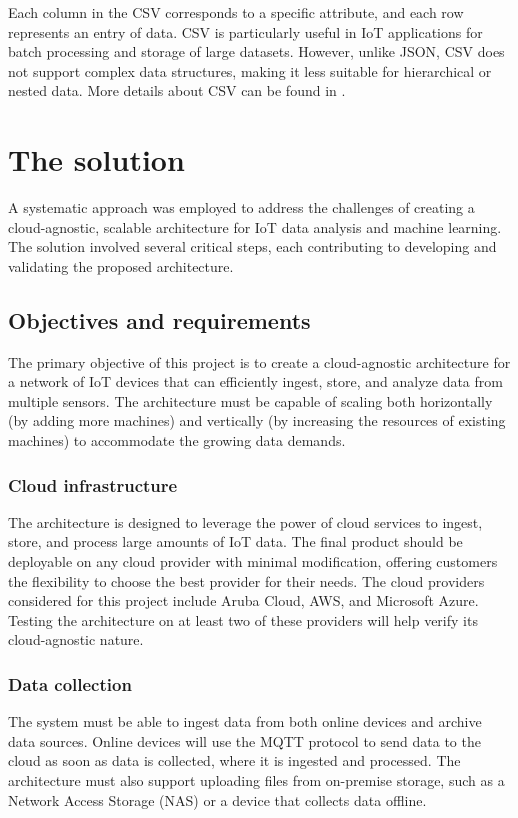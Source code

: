 Each column in the CSV corresponds to a specific attribute, and each row represents an entry of data. CSV is particularly useful in IoT applications for batch processing and storage of large datasets. However, unlike JSON, CSV does not support complex data structures, making it less suitable for hierarchical or nested data. More details about CSV can be found in \cite{site:csv-docs}.


\section{The solution}
\label{sec:the-solution}
A systematic approach was employed to address the challenges of creating a cloud-agnostic, scalable architecture for IoT data analysis
and machine learning. The solution involved several
critical steps, each contributing to developing and validating the proposed architecture.


\subsection{Objectives and requirements}
\label{sec:objectives-and-requirements}
The primary objective of this project is to create a cloud-agnostic architecture for a network of IoT devices that can efficiently ingest, store, and analyze data from multiple sensors. The architecture must be capable of scaling both horizontally (by adding more machines) and vertically (by increasing the resources of existing machines) to accommodate the growing data demands.

\subsubsection{Cloud infrastructure}
\label{sec:cloud-infrastructure}
The architecture is designed to leverage the power of cloud services to ingest, store, and process large amounts of IoT data. The final product should be deployable on any cloud provider with minimal modification, offering customers the flexibility to choose the best provider for their needs. The cloud providers considered for this project include Aruba Cloud\cite{site:aruba-cloud}, AWS\cite{site:aws}, and Microsoft Azure\cite{site:azure}. Testing the architecture on at least two of these providers will help verify its cloud-agnostic nature.

\subsubsection{Data collection}
\label{sec:data-collection}
The system must be able to ingest data from both online devices and archive data sources. Online devices will use the MQTT protocol to send data to the cloud as soon as data is collected, where it is ingested and processed. The architecture must also support uploading files from on-premise storage, such as a Network Access Storage (NAS) or a device that collects data offline.

